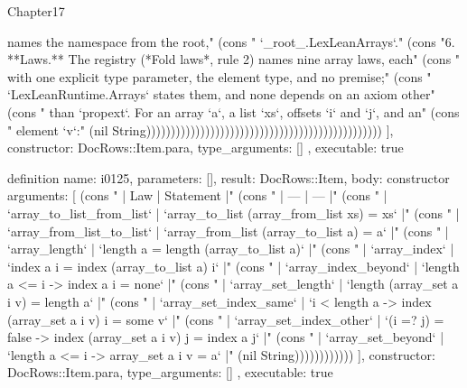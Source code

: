 \begin{lexlean}{Chapter17}
\begin{semanticmodule}
{{names the namespace from the root," (cons "   `_root_.LexLeanArrays`." (cons "6. **Laws.** The registry (*Fold laws*, rule 2) names nine array laws, each" (cons "   with one explicit type parameter, the element type, and no premise;" (cons "   `LexLeanRuntime.Arrays` states them, and none depends on an axiom other" (cons "   than `propext`. For an array `a`, a list `xs`, offsets `i` and `j`, and an" (cons "   element `v`:" (nil String))))))))))))))))))))))))))))))))))))))))))))))))
    ],
    constructor: DocRows::Item.para,
    type_arguments: []
  },
  executable: true
}

definition{
  name: i0125,
  parameters: [],
  result: DocRows::Item,
  body: constructor{
    arguments: [
      (cons "   | Law | Statement |" (cons "   | --- | --- |" (cons "   | `array_to_list_from_list` | `array_to_list (array_from_list xs) = xs` |" (cons "   | `array_from_list_to_list` | `array_from_list (array_to_list a) = a` |" (cons "   | `array_length` | `length a = length (array_to_list a)` |" (cons "   | `array_index` | `index a i = index (array_to_list a) i` |" (cons "   | `array_index_beyond` | `length a <= i -> index a i = none` |" (cons "   | `array_set_length` | `length (array_set a i v) = length a` |" (cons "   | `array_set_index_same` | `i < length a -> index (array_set a i v) i = some v` |" (cons "   | `array_set_index_other` | `(i =? j) = false -> index (array_set a i v) j = index a j` |" (cons "   | `array_set_beyond` | `length a <= i -> array_set a i v = a` |" (nil String))))))))))))
    ],
    constructor: DocRows::Item.para,
    type_arguments: []
  },
  executable: true
}


\end{semanticmodule}
\end{lexlean}

